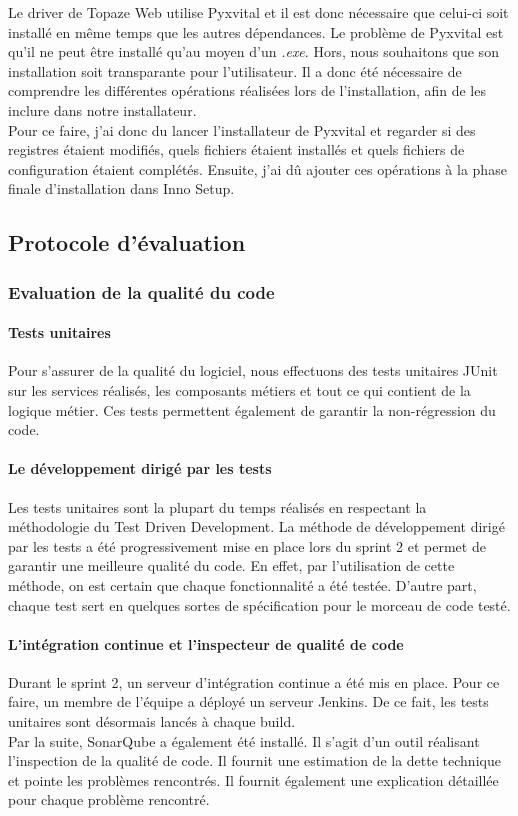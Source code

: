 Le driver de Topaze Web utilise Pyxvital et il est donc nécessaire que celui-ci soit installé en même temps que les autres dépendances. Le problème de Pyxvital est qu'il ne peut être installé qu'au moyen d'un \textit{.exe}. Hors, nous souhaitons que son installation soit transparante pour l'utilisateur. Il a donc été nécessaire de comprendre les différentes opérations réalisées lors de l'installation, afin de les inclure dans notre installateur.\\
Pour ce faire, j'ai donc du lancer l'installateur de Pyxvital et regarder si des registres étaient modifiés, quels fichiers étaient installés et quels fichiers de configuration étaient complétés. Ensuite, j'ai dû ajouter ces opérations à la phase finale d'installation dans Inno Setup.


\subsection{Protocole d'évaluation}
\subsubsection{Evaluation de la qualité du code}
\paragraph*{Tests unitaires\\}
Pour s'assurer de la qualité du logiciel, nous effectuons des tests unitaires JUnit sur les services réalisés, les composants métiers et tout ce qui contient de la logique métier. Ces tests permettent également de garantir la non-régression du code.

\paragraph*{Le développement dirigé par les tests\\}
Les tests unitaires sont la plupart du temps réalisés en respectant la méthodologie du Test Driven Development.
La méthode de développement dirigé par les tests a été progressivement mise en place lors du sprint 2 et permet de garantir une meilleure qualité du code. En effet, par l'utilisation de cette méthode, on est certain que chaque fonctionnalité a été testée. D'autre part, chaque test sert en quelques sortes de spécification pour le morceau de code testé.

\paragraph*{L'intégration continue et l'inspecteur de qualité de code\\} 
Durant le sprint 2, un serveur d'intégration continue a été mis en place. Pour ce faire, un membre de l'équipe a déployé un serveur Jenkins. De ce fait, les tests unitaires sont désormais lancés à chaque build. \\
Par la suite, SonarQube a également été installé. Il s'agit d'un outil réalisant l'inspection de la qualité de code. Il fournit une estimation de la dette technique et pointe les problèmes rencontrés. Il fournit également une explication détaillée pour chaque problème rencontré.

